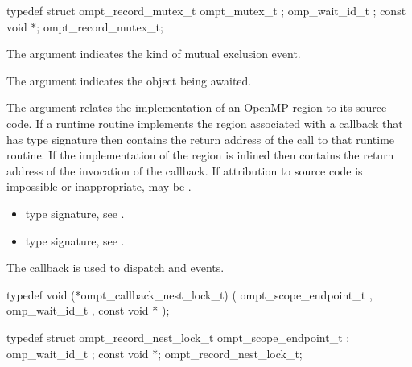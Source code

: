 \begin{ccppspecific}
\begin{omptRecord}
typedef struct ompt_record_mutex_t {
  ompt_mutex_t ;
  omp_wait_id_t ;
  const void *;
} ompt_record_mutex_t;
\end{omptRecord}
\end{ccppspecific}


\argdesc

The argument  indicates the kind of mutual exclusion event.

The argument  indicates the object being awaited.

The  argument relates the implementation of an OpenMP region
to its source code. If a runtime routine implements the region associated with
a callback that has type signature  then
 contains the return address of the call to that runtime routine.
If the implementation of the region is inlined then  contains the
return address of the invocation of the callback. If attribution to source code
is impossible or inappropriate, may be .

\crossreferences
\begin{itemize}
\item {} type signature, see
.
\item {} type signature, see
.
\end{itemize}



\label{sec:ompt_callback_nest_lock_t}
\summary
The  callback is used to dispatch
 and  events.

\format

\begin{ccppspecific}
\begin{omptCallback}
typedef void (*ompt_callback_nest_lock_t) (
  ompt_scope_endpoint_t ,
  omp_wait_id_t ,
  const void *
);
\end{omptCallback}
\end{ccppspecific}


\record

\begin{ccppspecific}
\begin{omptRecord}
typedef struct ompt_record_nest_lock_t {
  ompt_scope_endpoint_t ;
  omp_wait_id_t ;
  const void *;
} ompt_record_nest_lock_t;
\end{omptRecord}
\end{ccppspecific}


